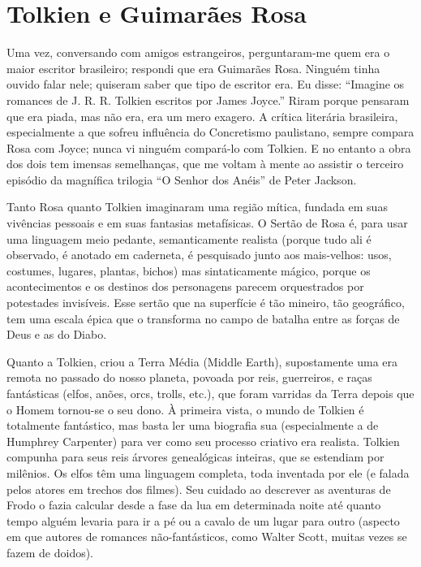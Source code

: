 \chapter{Tolkien e Guimarães Rosa}

Uma vez, conversando com amigos estrangeiros, perguntaram-me quem era
o maior escritor brasileiro; respondi que era Guimarães Rosa. Ninguém
tinha ouvido falar nele; quiseram saber que tipo de escritor era. Eu
disse: “Imagine os romances de J. R. R. Tolkien escritos por James
Joyce.” Riram porque pensaram que era piada, mas não era, era um mero
exagero. A crítica literária brasileira, especialmente a que sofreu
influência do Concretismo paulistano, sempre compara Rosa com Joyce;
nunca vi ninguém compará-lo com Tolkien. E no entanto a obra dos dois
tem imensas semelhanças, que me voltam à mente ao assistir o terceiro
episódio da magnífica trilogia “O Senhor dos Anéis” de Peter Jackson.

Tanto Rosa quanto Tolkien imaginaram uma região mítica, fundada em
suas vivências pessoais e em suas fantasias metafísicas. O Sertão de
Rosa é, para usar uma linguagem meio pedante, semanticamente realista
(porque tudo ali é observado, é anotado em caderneta, é pesquisado
junto aos mais-velhos: usos, costumes, lugares, plantas, bichos) mas
sintaticamente mágico, porque os acontecimentos e os destinos dos
personagens parecem orquestrados por potestades invisíveis. Esse
sertão que na superfície é tão mineiro, tão geográfico, tem uma
escala épica que o transforma no campo de batalha entre as forças de
Deus e as do Diabo.

Quanto a Tolkien, criou a Terra Média (Middle Earth), supostamente uma
era remota no passado do nosso planeta, povoada por reis, guerreiros,
e raças fantásticas (elfos, anões, orcs, trolls, etc.), que foram
varridas da Terra depois que o Homem tornou-se o seu dono. À primeira
vista, o mundo de Tolkien é totalmente fantástico, mas basta ler uma
biografia sua (especialmente a de Humphrey Carpenter) para ver como
seu processo criativo era realista. Tolkien compunha para seus reis
árvores genealógicas inteiras, que se estendiam por milênios. Os
elfos têm uma linguagem completa, toda inventada por ele (e falada
pelos atores em trechos dos filmes). Seu cuidado ao descrever as
aventuras de Frodo o fazia calcular desde a fase da lua em
determinada noite até quanto tempo alguém levaria para ir a pé ou a
cavalo de um lugar para outro (aspecto em que autores de romances
não-fantásticos, como Walter Scott, muitas vezes se fazem de doidos).


